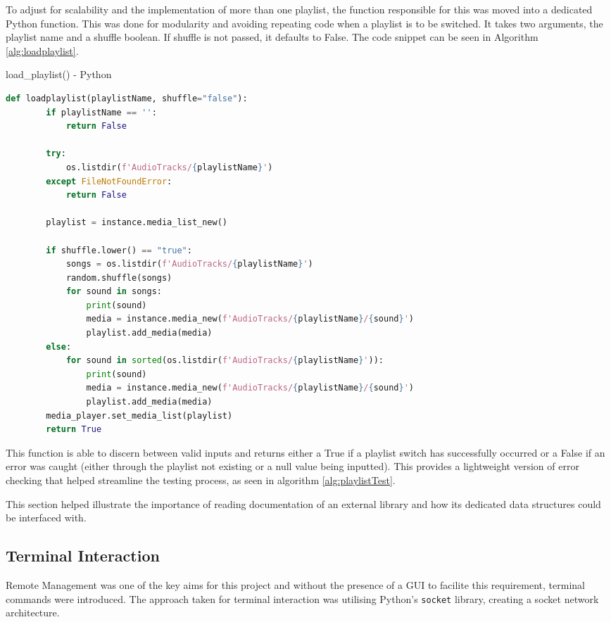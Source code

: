 To adjust for scalability and the implementation of more than one playlist, the function responsible for this was moved into a dedicated Python function. This was done for modularity and avoiding repeating code when a playlist is to be switched. It takes two arguments, the playlist name and a shuffle boolean. If shuffle is not passed, it defaults to False. The code snippet can be seen in Algorithm \ref{alg:loadplaylist}.
\begin{algorithm}[H]
  \caption{load\_playlist() - Python}
  \label{alg:loadplaylist}
  \begin{lstlisting}[language=Python]
    def loadplaylist(playlistName, shuffle="false"):
        if playlistName == '':
            return False
        
        try:
            os.listdir(f'AudioTracks/{playlistName}')
        except FileNotFoundError:
            return False
        
        playlist = instance.media_list_new()
        
        if shuffle.lower() == "true":
            songs = os.listdir(f'AudioTracks/{playlistName}')
            random.shuffle(songs)
            for sound in songs:
                print(sound)
                media = instance.media_new(f'AudioTracks/{playlistName}/{sound}')
                playlist.add_media(media)
        else:
            for sound in sorted(os.listdir(f'AudioTracks/{playlistName}')):
                print(sound)
                media = instance.media_new(f'AudioTracks/{playlistName}/{sound}')
                playlist.add_media(media)
        media_player.set_media_list(playlist)
        return True
  \end{lstlisting}
\end{algorithm}
This function is able to discern between valid inputs and returns either a True if a playlist switch has successfully occurred or a False if an error was caught (either through the playlist not existing or a null value being inputted). This provides a lightweight version of error checking that helped streamline the testing process, as seen in algorithm \ref{alg:playlistTest}. 

This section helped illustrate the importance of reading documentation of an external library and how its dedicated data structures could be interfaced with.
\subsection{Terminal Interaction}\label{subsec:terminal}
Remote Management was one of the key aims for this project and without the presence of a GUI to facilite this requirement, terminal commands were introduced. The approach taken for terminal interaction was utilising Python's \texttt{socket} library, creating a socket network architecture. 

